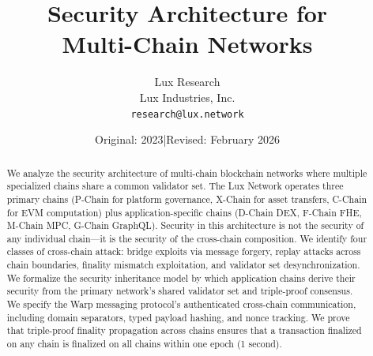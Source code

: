 \documentclass[11pt,a4paper]{article}
\title{Security Architecture for\\Multi-Chain Networks}
\author{
Lux Research \\
Lux Industries, Inc.\\
\texttt{research@lux.network}
}
\date{Original: 2023\quad|\quad Revised: February 2026}
\begin{document}
\luxcoverpage

\begin{abstract}
We analyze the security architecture of multi-chain blockchain networks where multiple specialized chains share a common validator set. The Lux Network operates three primary chains (P-Chain for platform governance, X-Chain for asset transfers, C-Chain for EVM computation) plus application-specific chains (D-Chain DEX, F-Chain FHE, M-Chain MPC, G-Chain GraphQL). Security in this architecture is not the security of any individual chain---it is the security of the cross-chain composition. We identify four classes of cross-chain attack: bridge exploits via message forgery, replay attacks across chain boundaries, finality mismatch exploitation, and validator set desynchronization. We formalize the security inheritance model by which application chains derive their security from the primary network's shared validator set and triple-proof consensus. We specify the Warp messaging protocol's authenticated cross-chain communication, including domain separators, typed payload hashing, and nonce tracking. We prove that triple-proof finality propagation across chains ensures that a transaction finalized on any chain is finalized on all chains within one epoch (1 second).
\end{abstract}











\end{document}
